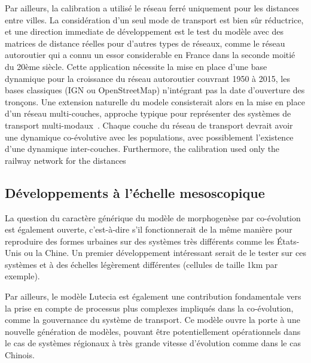 \documentclass[11pt]{article}
\begin{document}
Par ailleurs, la calibration a utilisé le réseau ferré uniquement pour les distances entre villes. La considération d'un seul mode de transport est bien sûr réductrice, et une direction immediate de développement est le test du modèle avec des matrices de distance réelles pour d'autres types de réseaux, comme le réseau autoroutier qui a connu un essor considerable en France dans la seconde moitié du 20ème siècle. Cette application nécessite la mise en place d'une base dynamique pour la croissance du réseau autoroutier couvrant 1950 à 2015, les bases classiques (IGN ou OpenStreetMap) n'intégrant pas la date d'ouverture des tronçons. Une extension naturelle du modele consisterait alors en la mise en place d'un réseau multi-couches, approche typique pour représenter des systèmes de transport multi-modaux~\citep{gallotti2014anatomy}. Chaque couche du réseau de transport devrait avoir une dynamique co-évolutive avec les populations, avec possiblement l'existence d'une dynamique inter-couches.
Furthermore, the calibration used only the railway network for the distances



\subsection{Développements à l'échelle mesoscopique}

La question du caractère générique du modèle de morphogenèse par co-évolution est également ouverte, c'est-à-dire s'il fonctionnerait de la même manière pour reproduire des formes urbaines sur des systèmes très différents comme les États-Unis ou la Chine. Un premier développement intéressant serait de le tester sur ces systèmes et à des échelles légèrement différentes (cellules de taille 1km par exemple).

Par ailleurs, le modèle Lutecia est également une contribution fondamentale vers la prise en compte de processus plus complexes impliqués dans la co-évolution, comme la gouvernance du système de transport.
 Ce modèle ouvre la porte à une nouvelle génération de modèles, pouvant être potentiellement opérationnels dans le cas de systèmes régionaux à très grande vitesse d'évolution comme dans le cas Chinois.
\end{document}

